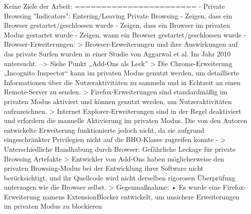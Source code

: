 Keine Ziele der Arbeit:
=======================
- 	Private Browsing "Indicators": Entering/Leaving Private Browsing \cite{Ohana.2013}
-	Zeigen, dass ein Browser gestartet/geschlossen wurde
-	Zeigen, dass ein Browser im privaten Modus gestartet wurde
-	Zeigen, wann ein Browser gestartet/geschlossen wurde
- Browser-Erweiterungen: \cite{Satvat.2014}
	> Browser-Erweiterungen und ihre Auswirkungen auf das private Surfen wurden in einer Studie von Aggarwal et al. Im Jahr 2010 untersucht. --> Siehe Punkt „Add-Ons als Leck”
	> Die Chrome-Erweiterung „Incognito Inspector“ kann im privaten Modus genutzt werden, um detaillierte Informationen über die Nutzeraktivitäten zu sammeln und in Echtzeit an einen Remote-Server zu senden.
	> Firefox-Erweiterungen sind standardmäßig im privaten Modus aktiviert und können genutzt werden, um Nutzeraktivitäten aufzuzeichnen.
	> Internet Explorer-Erweiterungen sind in der Regel deaktiviert und erfordern die manuelle Aktivierung im privaten Modus. Die von den Autoren entwickelte Erweiterung funktionierte jedoch nicht, da sie aufgrund eingeschränkter Privilegien nicht auf die BHO-Klasse zugreifen konnte
- \cite{Aggarwal.2010}
	> Unterschiedliche Handhabung durch Browser: Gefährliche Leckage für private Browsing Artefakte
	> Entwickler von Add-Ons haben möglicherweise den privaten Browsing-Modus bei der Entwicklung ihrer Software nicht berücksichtigt, und ihr Quellcode wird nicht derselben rigorosen Überprüfung unterzogen wie die Browser selbst.
	> Gegenmaßnahme: \cite{Aggarwal.2010} 
		•	Es wurde eine Firefox-Erweiterung namens ExtensionBlocker entwickelt, um unsichere Erweiterungen im privaten Modus zu blockieren



